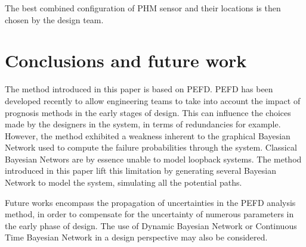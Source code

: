 The best combined configuration of PHM sensor and their locations is then chosen by the design team.

\section{Conclusions and future work}

The method introduced in this paper is based on PEFD. PEFD has been developed recently to allow engineering teams to take into account the impact of prognosis methods in the early stages of design. This can influence the choices made by the designers in the system, in terms of redundancies for example. However, the method exhibited a weakness inherent to the graphical Bayesian Network used to compute the failure probabilities through the system. Classical Bayesian Networs are by essence unable to model loopback systems. The method introduced in this paper lift this limitation by generating several Bayesian Network to model the system, simulating all the potential paths.

Future works encompass the propagation of uncertainties in the PEFD analysis method, in order to compensate for the uncertainty of numerous parameters in the early phase of design. The use of Dynamic Bayesian Network or Continuous Time Bayesian Network in a design perspective may also be considered.
